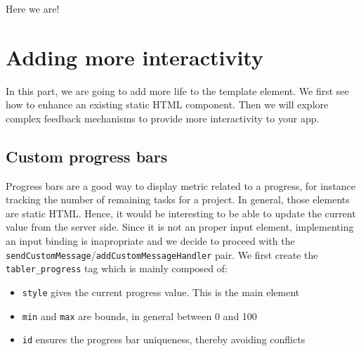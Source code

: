 \documentclass[]{book}
\newenvironment{Shaded}{\begin{snugshade}}{\end{snugshade}}
\newcommand{\ControlFlowTok}[1]{\textcolor[rgb]{0.13,0.29,0.53}{\textbf{#1}}}
\newcommand{\DataTypeTok}[1]{\textcolor[rgb]{0.13,0.29,0.53}{#1}}
\newcommand{\DecValTok}[1]{\textcolor[rgb]{0.00,0.00,0.81}{#1}}
\newcommand{\KeywordTok}[1]{\textcolor[rgb]{0.13,0.29,0.53}{\textbf{#1}}}
\newcommand{\NormalTok}[1]{#1}
\newcommand{\OperatorTok}[1]{\textcolor[rgb]{0.81,0.36,0.00}{\textbf{#1}}}
\newcommand{\StringTok}[1]{\textcolor[rgb]{0.31,0.60,0.02}{#1}}
\providecommand{\tightlist}{%
  \setlength{\itemsep}{0pt}\setlength{\parskip}{0pt}}
\begin{document}
\begin{Shaded}
\end{Shaded}

Here we are!

\hypertarget{custom-templates-interactivity}{%
\chapter{Adding more interactivity}\label{custom-templates-interactivity}}

In this part, we are going to add more life to the template element. We first see how
to enhance an existing static HTML component. Then we will explore complex feedback mechanisms to provide more interactivity to your app.

\hypertarget{custom-progress-bars}{%
\section{Custom progress bars}\label{custom-progress-bars}}

Progress bars are a good way to display metric related to a progress, for instance tracking the number of remaining tasks for a project. In general, those
elements are static HTML. Hence, it would be interesting to be able to update the current
value from the server side. Since it is not an proper input element, implementing an input binding is inapropriate and we decide to proceed with the \texttt{sendCustomMessage}/\texttt{addCustomMessageHandler} pair. We first create the \texttt{tabler\_progress}
tag which is mainly composed of:

\begin{itemize}
\tightlist
\item
  \texttt{style} gives the current progress value. This is the main element
\item
  \texttt{min} and \texttt{max} are bounds, in general between 0 and 100
\item
  \texttt{id} ensures the progress bar uniqueness, thereby avoiding conflicts
\end{itemize}
\end{document}
